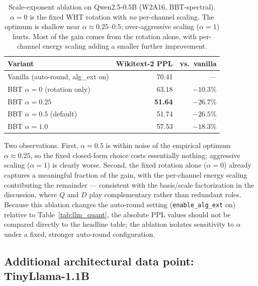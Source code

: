 \documentclass[11pt]{article}
\begin{document}
\begin{table}[h]
\centering
\small
\caption{Scale-exponent ablation on Qwen2.5-0.5B (W2A16, BBT-spectral). $\alpha=0$ is the fixed WHT rotation with \emph{no} per-channel scaling. The optimum is shallow near $\alpha \approx 0.25$--$0.5$; over-aggressive scaling ($\alpha=1$) hurts. Most of the gain comes from the rotation alone, with per-channel energy scaling adding a smaller further improvement.}
\label{tab:alpha}
\begin{tabular}{lrr}
\toprule
Variant & Wikitext-2 PPL & vs.\ vanilla \\
\midrule
Vanilla (auto-round, alg\_ext on) & 70.41 & --- \\
BBT $\alpha=0$ (rotation only) & 63.18 & $-10.3\%$ \\
BBT $\alpha=0.25$ & \textbf{51.64} & $\mathbf{-26.7\%}$ \\
BBT $\alpha=0.5$ (default) & 51.74 & $-26.5\%$ \\
BBT $\alpha=1.0$ & 57.53 & $-18.3\%$ \\
\bottomrule
\end{tabular}
\end{table}

Two observations. First, $\alpha = 0.5$ is within noise of the empirical optimum $\alpha \approx 0.25$, so the fixed closed-form choice costs essentially nothing; aggressive scaling ($\alpha = 1$) is clearly worse. Second, the fixed rotation alone ($\alpha = 0$) already captures a meaningful fraction of the gain, with the per-channel energy scaling contributing the remainder --- consistent with the basis/scale factorization in the discussion, where $Q$ and $D$ play complementary rather than redundant roles. Because this ablation changes the auto-round setting (\texttt{enable\_alg\_ext} on) relative to Table~\ref{tab:llm_quant}, the absolute PPL values should not be compared directly to the headline table; the ablation isolates sensitivity to $\alpha$ under a fixed, stronger auto-round configuration.

\subsection{Additional architectural data point: TinyLlama-1.1B}
\end{document}
